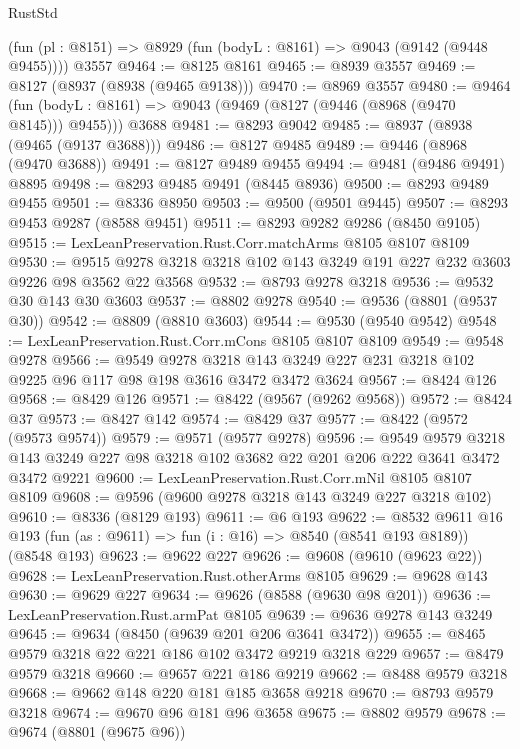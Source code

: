 \begin{lexlean}{RustStd}
\begin{coremodule}
    (fun (pl : @8151) => @8929 (fun (bodyL : @8161) => @9043 (@9142 (@9448 @9455))))
    @3557
@9464 := @8125 @8161
@9465 := @8939 @3557
@9469 := @8127 (@8937 (@8938 (@9465 @9138)))
@9470 := @8969 @3557
@9480 := @9464
    (fun (bodyL : @8161) => @9043 (@9469 (@8127 (@9446 (@8968 (@9470 @8145))) @9455)))
    @3688
@9481 := @8293 @9042
@9485 := @8937 (@8938 (@9465 (@9137 @3688)))
@9486 := @8127 @9485
@9489 := @9446 (@8968 (@9470 @3688))
@9491 := @8127 @9489 @9455
@9494 := @9481 (@9486 @9491) @8895
@9498 := @8293 @9485 @9491 (@8445 @8936)
@9500 := @8293 @9489 @9455
@9501 := @8336 @8950
@9503 := @9500 (@9501 @9445)
@9507 := @8293 @9453 @9287 (@8588 @9451)
@9511 := @8293 @9282 @9286 (@8450 @9105)
@9515 := LexLeanPreservation.Rust.Corr.matchArms @8105 @8107 @8109
@9530 := @9515 @9278 @3218 @3218 @102 @143 @3249 @191 @227 @232 @3603 @9226 @98 @3562 @22 @3568
@9532 := @8793 @9278 @3218
@9536 := @9532 @30 @143 @30 @3603
@9537 := @8802 @9278
@9540 := @9536 (@8801 (@9537 @30))
@9542 := @8809 (@8810 @3603)
@9544 := @9530 (@9540 @9542)
@9548 := LexLeanPreservation.Rust.Corr.mCons @8105 @8107 @8109
@9549 := @9548 @9278
@9566 := @9549
    @9278
    @3218
    @143
    @3249
    @227
    @231
    @3218
    @102
    @9225
    @96
    @117
    @98
    @198
    @3616
    @3472
    @3472
    @3624
@9567 := @8424 @126
@9568 := @8429 @126
@9571 := @8422 (@9567 (@9262 @9568))
@9572 := @8424 @37
@9573 := @8427 @142
@9574 := @8429 @37
@9577 := @8422 (@9572 (@9573 @9574))
@9579 := @9571 (@9577 @9278)
@9596 := @9549
    @9579
    @3218
    @143
    @3249
    @227
    @98
    @3218
    @102
    @3682
    @22
    @201
    @206
    @222
    @3641
    @3472
    @3472
    @9221
@9600 := LexLeanPreservation.Rust.Corr.mNil @8105 @8107 @8109
@9608 := @9596 (@9600 @9278 @3218 @143 @3249 @227 @3218 @102)
@9610 := @8336 (@8129 @193)
@9611 := @6 @193
@9622 := @8532
    @9611
    @16
    @193
    (fun (as : @9611) => fun (i : @16) => @8540 (@8541 @193 @8189))
    (@8548 @193)
@9623 := @9622 @227
@9626 := @9608 (@9610 (@9623 @22))
@9628 := LexLeanPreservation.Rust.otherArms @8105
@9629 := @9628 @143
@9630 := @9629 @227
@9634 := @9626 (@8588 (@9630 @98 @201))
@9636 := LexLeanPreservation.Rust.armPat @8105
@9639 := @9636 @9278 @143 @3249
@9645 := @9634 (@8450 (@9639 @201 @206 @3641 @3472))
@9655 := @8465 @9579 @3218 @22 @221 @186 @102 @3472 @9219 @3218 @229
@9657 := @8479 @9579 @3218
@9660 := @9657 @221 @186 @9219
@9662 := @8488 @9579 @3218
@9668 := @9662 @148 @220 @181 @185 @3658 @9218
@9670 := @8793 @9579 @3218
@9674 := @9670 @96 @181 @96 @3658
@9675 := @8802 @9579
@9678 := @9674 (@8801 (@9675 @96))

\end{coremodule}
\end{lexlean}
